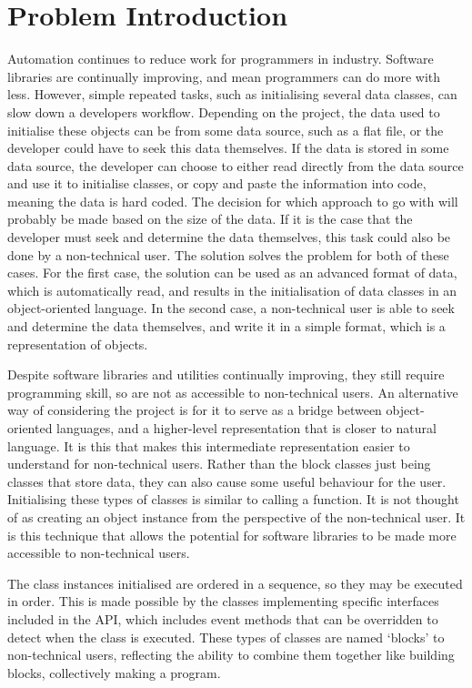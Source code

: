 \chapter{Problem Introduction}

Automation continues to reduce work for programmers in industry. Software libraries are continually improving, and mean programmers can do more with less. However, simple repeated tasks, such as initialising several data classes, can slow down a developers workflow. Depending on the project, the data used to initialise these objects can be from some data source, such as a flat file, or the developer could have to seek this data themselves. If the data is stored in some data source, the developer can choose to either read directly from the data source and use it to initialise classes, or copy and paste the information into code, meaning the data is hard coded. The decision for which approach to go with will probably be made based on the size of the data. If it is the case that the developer must seek and determine the data themselves, this task could also be done by a non-technical user. The solution solves the problem for both of these cases. For the first case, the solution can be used as an advanced format of data, which is automatically read, and results in the initialisation of data classes in an object-oriented language. In the second case, a non-technical user is able to seek and determine the data themselves, and write it in a simple format, which is a representation of objects.\par
Despite software libraries and utilities continually improving, they still require programming skill, so are not as accessible to non-technical users. An alternative way of considering the project is for it to serve as a bridge between object-oriented languages, and a higher-level representation that is closer to natural language. It is this that makes this intermediate representation easier to understand for non-technical users. Rather than the block classes just being classes that store data, they can also cause some useful behaviour for the user. Initialising these types of classes is similar to calling a function. It is not thought of as creating an object instance from the perspective of the non-technical user. It is this technique that allows the potential for software libraries to be made more accessible to non-technical users.\par
The class instances initialised are ordered in a sequence, so they may be executed in order. This is made possible by the classes implementing specific interfaces included in the API, which includes event methods that can be overridden to detect when the class is executed. These types of classes are named ‘blocks’ to non-technical users, reflecting the ability to combine them together like building blocks, collectively making a program.
